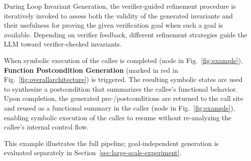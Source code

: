 During Loop Invariant Generation, the verifier-guided refinement procedure is iteratively invoked to assess both the validity of the generated invariants and their usefulness for proving the given verification goal when such a goal is available. Depending on verifier feedback, different refinement strategies guide the LLM toward verifier-checked invariants. 

When symbolic execution of the callee is completed (node  in Fig.~\ref{fig:example}), \textbf{Function Postcondition Generation} (marked in red in Fig.~\ref{fig:overallarchitecture}) is triggered. The resulting symbolic states are used to synthesize a postcondition that summarizes the callee's functional behavior. Upon completion, the generated pre-/postconditions are returned to the call site and reused as a functional summary in the caller (node  in Fig.~\ref{fig:example}), enabling symbolic execution of the caller to resume without re-analyzing the callee's internal control flow. 







This example illustrates the full pipeline; goal-independent generation is evaluated separately in Section~\ref{sec:large-scale-experiment}.
